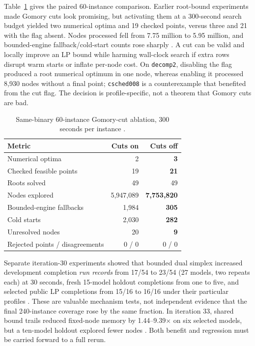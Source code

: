 \documentclass[10pt,a4paper,twocolumn]{article}
\begin{document}
Table~\ref{tab:ablation} gives the paired 60-instance comparison. Earlier root-bound experiments made Gomory cuts look promising, but activating them at a 300-second search budget yielded two numerical optima and 19 checked points, versus three and 21 with the flag absent. Nodes processed fell from 7.75 million to 5.95 million, and bounded-engine fallback/cold-start counts rose sharply \cite{iter37}. A cut can be valid and locally improve an LP bound while harming wall-clock search if extra rows disrupt warm starts or inflate per-node cost. On \texttt{decomp2}, disabling the flag produced a root numerical optimum in one node, whereas enabling it processed 8,930 nodes without a final point; \texttt{csched008} is a counterexample that benefited from the cut flag. The decision is profile-specific, not a theorem that Gomory cuts are bad.

\begin{table}[t]
\centering\small
\caption{Same-binary 60-instance Gomory-cut ablation, 300 seconds per instance \cite{iter37}.}
\label{tab:ablation}
\begin{tabular}{@{}lrr@{}}
\toprule
Metric & Cuts on & Cuts off\\
\midrule
Numerical optima & 2 & \textbf{3}\\
Checked feasible points & 19 & \textbf{21}\\
Roots solved & 49 & 49\\
Nodes explored & 5,947,089 & \textbf{7,753,820}\\
Bounded-engine fallbacks & 1,984 & \textbf{305}\\
Cold starts & 2,030 & \textbf{282}\\
Unresolved nodes & 20 & \textbf{9}\\
Rejected points / disagreements & 0 / 0 & 0 / 0\\
\bottomrule
\end{tabular}
\end{table}

Separate iteration-30 experiments showed that bounded dual simplex increased development completion \emph{run records} from 17/54 to 23/54 (27 models, two repeats each) at 30 seconds, fresh 15-model holdout completions from one to five, and selected public LP completions from 15/16 to 16/16 under their particular profiles \cite{iter30}. These are valuable mechanism tests, not independent evidence that the final 240-instance coverage rose by the same fraction. In iteration 33, shared bound trails reduced fixed-node memory by 1.44--9.39$\times$ on six selected models, but a ten-model holdout explored fewer nodes \cite{iter33}. Both benefit and regression must be carried forward to a full rerun.
\end{document}
